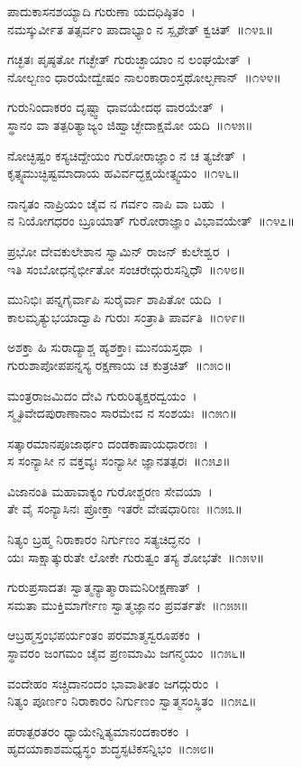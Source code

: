 ಪಾದುಕಾಸನಶಯ್ಯಾದಿ ಗುರುಣಾ ಯದಧಿಷ್ಠಿತಂ~।\\
ನಮಸ್ಕುರ್ವೀತ ತತ್ಸರ್ವಂ ಪಾದಾಭ್ಯಾಂ ನ ಸ್ಪೃಶೇತ್ ಕ್ವಚಿತ್~॥೧೪೩॥

ಗಚ್ಛತಃ ಪೃಷ್ಠತೋ ಗಚ್ಛೇತ್ ಗುರುಚ್ಛಾಯಾಂ ನ ಲಂಘಯೇತ್~।\\
ನೋಲ್ಬಣಂ ಧಾರಯೇದ್ವೇಷಂ ನಾಲಂಕಾರಾಂಸ್ತಥೋಲ್ಬಣಾನ್~॥೧೪೪॥

ಗುರುನಿಂದಾಕರಂ ದೃಷ್ಟ್ವಾ ಧಾವಯೇದಥ ವಾರಯೇತ್~।\\
ಸ್ಥಾನಂ ವಾ ತತ್ಪರಿತ್ಯಾಜ್ಯಂ ಜಿಹ್ವಾಚ್ಛೇದಾಕ್ಷಮೋ ಯದಿ~॥೧೪೫॥

ನೋಚ್ಛಿಷ್ಟಂ ಕಸ್ಯಚಿದ್ದೇಯಂ ಗುರೋರಾಜ್ಞಾಂ ನ ಚ ತ್ಯಜೇತ್~।\\
ಕೃತ್ಸ್ನಮುಚ್ಛಿಷ್ಟಮಾದಾಯ ಹವಿರ್ವದ್ಭಕ್ಷಯೇತ್ಸ್ವಯಂ~॥೧೪೬॥

ನಾನೃತಂ ನಾಪ್ರಿಯಂ ಚೈವ ನ ಗರ್ವಂ ನಾಪಿ ವಾ ಬಹು~।\\
ನ ನಿಯೋಗಧರಂ ಬ್ರೂಯಾತ್ ಗುರೋರಾಜ್ಞಾಂ ವಿಭಾವಯೇತ್~॥೧೪೭॥

ಪ್ರಭೋ ದೇವಕುಲೇಶಾನ ಸ್ವಾಮಿನ್ ರಾಜನ್ ಕುಲೇಶ್ವರ~।\\
ಇತಿ ಸಂಬೋಧನೈರ್ಭೀತೋ ಸಂಚರೇದ್ಗುರುಸನ್ನಿಧೌ~॥೧೪೮॥

ಮುನಿಭಿಃ ಪನ್ನಗೈರ್ವಾಪಿ ಸುರೈರ್ವಾ ಶಾಪಿತೋ ಯದಿ~।\\
ಕಾಲಮೃತ್ಯುಭಯಾದ್ವಾಪಿ ಗುರುಃ ಸಂತ್ರಾತಿ ಪಾರ್ವತಿ~॥೧೪೯॥

ಅಶಕ್ತಾ ಹಿ ಸುರಾದ್ಯಾಶ್ಚ ಹ್ಯಶಕ್ತಾಃ ಮುನಯಸ್ತಥಾ~।\\
ಗುರುಶಾಪೋಪಪನ್ನಸ್ಯ ರಕ್ಷಣಾಯ ಚ ಕುತ್ರಚಿತ್~॥೧೫೦॥

ಮಂತ್ರರಾಜಮಿದಂ ದೇವಿ ಗುರುರಿತ್ಯಕ್ಷರದ್ವಯಂ~।\\
ಸ್ಮೃತಿವೇದಪುರಾಣಾನಾಂ ಸಾರಮೇವ ನ ಸಂಶಯಃ~॥೧೫೧॥

ಸತ್ಕಾರಮಾನಪೂಜಾರ್ಥಂ ದಂಡಕಾಷಾಯಧಾರಣಃ~।\\
ಸ ಸಂನ್ಯಾಸೀ ನ ವಕ್ತವ್ಯಃ ಸಂನ್ಯಾಸೀ ಜ್ಞಾನತತ್ಪರಃ~॥೧೫೨॥

ವಿಜಾನಂತಿ ಮಹಾವಾಕ್ಯಂ ಗುರೋಶ್ಚರಣ ಸೇವಯಾ~।\\
ತೇ ವೈ ಸಂನ್ಯಾಸಿನಃ ಪ್ರೋಕ್ತಾ ಇತರೇ ವೇಷಧಾರಿಣಃ~॥೧೫೩॥

ನಿತ್ಯಂ ಬ್ರಹ್ಮ ನಿರಾಕಾರಂ ನಿರ್ಗುಣಂ ಸತ್ಯಚಿದ್ಘನಂ~।\\
ಯಃ ಸಾಕ್ಷಾತ್ಕುರುತೇ ಲೋಕೇ ಗುರುತ್ವಂ ತಸ್ಯ ಶೋಭತೇ~॥೧೫೪॥

ಗುರುಪ್ರಸಾದತಃ ಸ್ವಾತ್ಮನ್ಯಾತ್ಮಾರಾಮನಿರೀಕ್ಷಣಾತ್~।\\
ಸಮತಾ ಮುಕ್ತಿಮಾರ್ಗೇಣ ಸ್ವಾತ್ಮಜ್ಞಾನಂ ಪ್ರವರ್ತತೇ~॥೧೫೫॥

ಆಬ್ರಹ್ಮಸ್ತಂಭಪರ್ಯಂತಂ ಪರಮಾತ್ಮಸ್ವರೂಪಕಂ~।\\
ಸ್ಥಾವರಂ ಜಂಗಮಂ ಚೈವ ಪ್ರಣಮಾಮಿ ಜಗನ್ಮಯಂ~॥೧೫೬॥

ವಂದೇಹಂ ಸಚ್ಚಿದಾನಂದಂ ಭಾವಾತೀತಂ ಜಗದ್ಗುರುಂ~।\\
ನಿತ್ಯಂ ಪೂರ್ಣಂ ನಿರಾಕಾರಂ ನಿರ್ಗುಣಂ ಸ್ವಾತ್ಮಸಂಸ್ಥಿತಂ~॥೧೫೭॥

ಪರಾತ್ಪರತರಂ ಧ್ಯಾಯೇನ್ನಿತ್ಯಮಾನಂದಕಾರಕಂ~।\\
ಹೃದಯಾಕಾಶಮಧ್ಯಸ್ಥಂ ಶುದ್ಧಸ್ಫಟಿಕಸನ್ನಿಭಂ~॥೧೫೮॥

